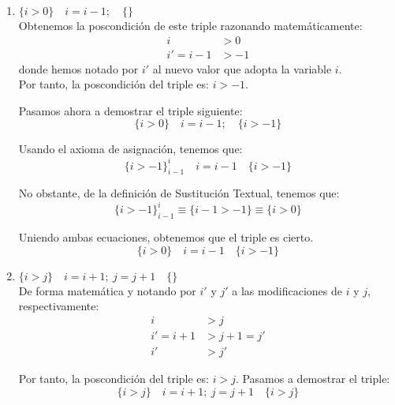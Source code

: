 \begin{ejercicio}
\begin{enumerate}
        \item $\{i > 0\} \quad i = i - 1; \quad \{ \}$\\
            Obtenemos la poscondición de este triple razonando matemáticamente:
            \begin{align*}
                i &> 0 \\
                i' = i - 1 &> -1
            \end{align*}
            donde hemos notado por $i'$ al nuevo valor que adopta la variable $i$.\\

            Por tanto, la poscondición del triple es: $i > -1$.

            Pasamos ahora a demostrar el triple siguiente:
            \begin{equation*}
                \{i > 0\} \quad i = i - 1; \quad \{i > -1\}
            \end{equation*}

            Usando el axioma de asignación, tenemos que:
            \begin{equation*}
                \{i > -1\}^i_{i-1}\quad i=i-1\quad \{i>-1\}
            \end{equation*}

            No obstante, de la definición de Sustitución Textual, tenemos que:
            \begin{equation*}
                \{i > -1\}^i_{i-1} \equiv \{i-1 > -1\} \equiv \{i > 0\}
            \end{equation*}

            Uniendo ambas ecuaciones, obtenemos que el triple es cierto.
            \begin{equation*}
                \{i > 0\}\quad i = i - 1\quad \{i > -1\}
            \end{equation*}

        \item $\{i > j\} \quad i = i + 1;~j = j + 1 \quad \{ \}$\\
            De forma matemática y notando por $i'$ y $j'$ a las modificaciones de $i$ y $j$, respectivamente:
            \begin{align*}
                i &> j \\
                i' = i+1 &> j+1=j'\\
                i' &> j'
            \end{align*}

            Por tanto, la poscondición del triple es: $i > j$. Pasamos a demostrar el triple:
            \begin{equation*}
                \{i > j\} \quad i = i + 1;~j = j + 1 \quad \{i>j\}
            \end{equation*}


\end{enumerate}
\end{ejercicio}
